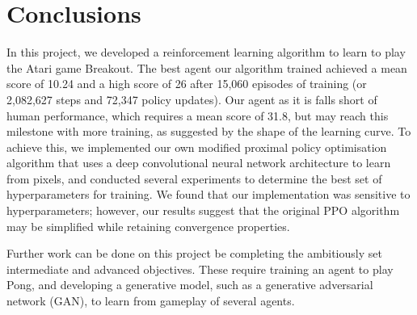 \documentclass[12pt,a4paper]{article}
\begin{document}
\section{Conclusions}
In this project, we developed a reinforcement learning algorithm to learn to play the Atari game Breakout. The best agent our algorithm trained achieved a mean score of 10.24 and a high score of 26 after 15,060 episodes of training (or 2,082,627 steps and 72,347 policy updates). Our agent as it is falls short of human performance, which requires a mean score of 31.8, but may reach this milestone with more training, as suggested by the shape of the learning curve. To achieve this, we implemented our own modified proximal policy optimisation algorithm that uses a deep convolutional neural network architecture to learn from pixels, and conducted several experiments to determine the best set of hyperparameters for training. We found that our implementation was sensitive to hyperparameters; however, our results suggest that the original PPO algorithm may be simplified while retaining convergence properties.

Further work can be done on this project be completing the ambitiously set intermediate and advanced objectives. These require training an agent to play Pong, and developing a generative model, such as a generative adversarial network (GAN), to learn from gameplay of several agents.


\end{document}
